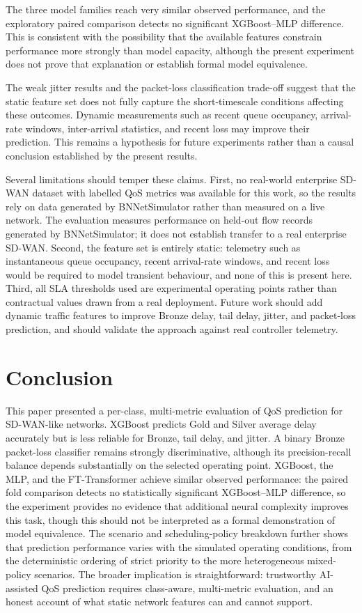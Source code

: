 \documentclass[conference]{IEEEtran}
\begin{document}
The three model families reach very similar observed performance, and the exploratory paired comparison detects no significant XGBoost--MLP difference. This is consistent with the possibility that the available features constrain performance more strongly than model capacity, although the present experiment does not prove that explanation or establish formal model equivalence.

The weak jitter results and the packet-loss classification trade-off suggest that the static feature set does not fully capture the short-timescale conditions affecting these outcomes. Dynamic measurements such as recent queue occupancy, arrival-rate windows, inter-arrival statistics, and recent loss may improve their prediction. This remains a hypothesis for future experiments rather than a causal conclusion established by the present results.

Several limitations should temper these claims. First, no real-world enterprise SD-WAN dataset with labelled QoS metrics was available for this work, so the results rely on data generated by BNNetSimulator rather than measured on a live network. The evaluation measures performance on held-out flow records generated by BNNetSimulator; it does not establish transfer to a real enterprise SD-WAN. Second, the feature set is entirely static: telemetry such as instantaneous queue occupancy, recent arrival-rate windows, and recent loss would be required to model transient behaviour, and none of this is present here. Third, all SLA thresholds used are experimental operating points rather than contractual values drawn from a real deployment. Future work should add dynamic traffic features to improve Bronze delay, tail delay, jitter, and packet-loss prediction, and should validate the approach against real controller telemetry.

\section{Conclusion}

This paper presented a per-class, multi-metric evaluation of QoS prediction for SD-WAN-like networks. XGBoost predicts Gold and Silver average delay accurately but is less reliable for Bronze, tail delay, and jitter. A binary Bronze packet-loss classifier remains strongly discriminative, although its precision-recall balance depends substantially on the selected operating point. XGBoost, the MLP, and the FT-Transformer achieve similar observed performance: the paired fold comparison detects no statistically significant XGBoost--MLP difference, so the experiment provides no evidence that additional neural complexity improves this task, though this should not be interpreted as a formal demonstration of model equivalence. The scenario and scheduling-policy breakdown further shows that prediction performance varies with the simulated operating conditions, from the deterministic ordering of strict priority to the more heterogeneous mixed-policy scenarios. The broader implication is straightforward: trustworthy AI-assisted QoS prediction requires class-aware, multi-metric evaluation, and an honest account of what static network features can and cannot support.



\end{document}
